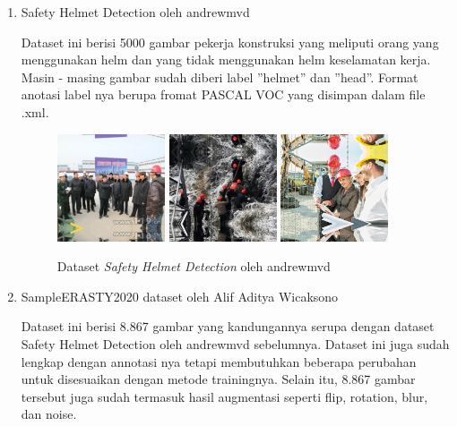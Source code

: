 \begin{enumerate}
  \item Safety Helmet Detection oleh andrewmvd
  \par Dataset ini berisi 5000 gambar pekerja konstruksi yang meliputi orang yang menggunakan helm dan yang tidak menggunakan helm keselamatan kerja. Masin - masing gambar sudah diberi label ”helmet” dan ”head”. Format anotasi label nya berupa fromat PASCAL VOC yang disimpan dalam file .xml.  

  \begin{figure}[ht]
    \centering
    \includegraphics[width=0.3\textwidth]{gambar/sample_kaggle1/hard_hat_workers0.png}
    \includegraphics[width=0.3\textwidth]{gambar/sample_kaggle1/hard_hat_workers1.png}
    \includegraphics[width=0.3\textwidth]{gambar/sample_kaggle1/hard_hat_workers19.png}
    \caption{Dataset \emph{Safety Helmet Detection} oleh andrewmvd}
    \label{fig:datasethelmetdetectionpreview}  
  \end{figure}

  \item SampleERASTY2020 dataset oleh Alif Aditya Wicaksono
  \par Dataset ini berisi 8.867 gambar yang kandungannya serupa dengan dataset Safety Helmet Detection oleh andrewmvd sebelumnya. Dataset ini juga sudah lengkap dengan annotasi nya tetapi membutuhkan beberapa perubahan untuk disesuaikan dengan  metode trainingnya. Selain itu, 8.867 gambar tersebut juga sudah termasuk hasil augmentasi seperti flip, rotation, blur, dan noise.


\end{enumerate}
